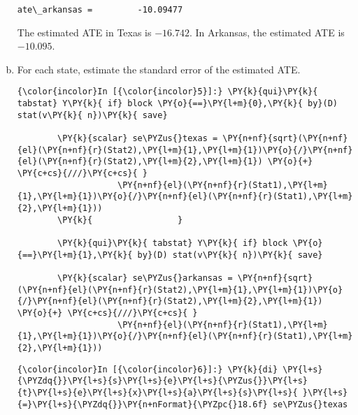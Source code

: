 \documentclass[11pt,notitlepage]{article}\usepackage[]{graphicx}\usepackage[]{color}
\makeatletter
\newenvironment{kframe}{%
 \def\at@end@of@kframe{}%
 \ifinner\ifhmode%
  \def\at@end@of@kframe{\end{minipage}}%
  \begin{minipage}{\columnwidth}%
 \fi\fi%
 \def\FrameCommand##1{\hskip\@totalleftmargin \hskip-\fboxsep
 \colorbox{shadecolor}{##1}\hskip-\fboxsep
     \hskip-\linewidth \hskip-\@totalleftmargin \hskip\columnwidth}%
 \MakeFramed {\advance\hsize-\width
   \@totalleftmargin\z@ \linewidth\hsize
   \@setminipage}}%
 {\par\unskip\endMakeFramed%
 \at@end@of@kframe}
\newenvironment{knitrout}{}{} %
\makeatother
\begin{document}
\begin{enumerate}[a)]
\begin{knitrout}
\begin{kframe}
    \begin{Verbatim}[commandchars=\\\{\}]
ate\_arkansas =         -10.09477

    \end{Verbatim}
\end{kframe}
\end{knitrout}

The estimated ATE in Texas is \ensuremath{-16.742}.  In Arkansas, the estimated ATE is \ensuremath{-10.095}.

\item For each state, estimate the standard error of the estimated ATE.
\begin{knitrout}
\color{fgcolor}\begin{kframe}
   \begin{Verbatim}[commandchars=\\\{\}]
{\color{incolor}In [{\color{incolor}5}]:} \PY{k}{qui}\PY{k}{ tabstat} Y\PY{k}{ if} block \PY{o}{==}\PY{l+m}{0},\PY{k}{ by}(D) stat(v\PY{k}{ n})\PY{k}{ save}	
        
        \PY{k}{scalar} se\PYZus{}texas = \PY{n+nf}{sqrt}(\PY{n+nf}{el}(\PY{n+nf}{r}(Stat2),\PY{l+m}{1},\PY{l+m}{1})\PY{o}{/}\PY{n+nf}{el}(\PY{n+nf}{r}(Stat2),\PY{l+m}{2},\PY{l+m}{1}) \PY{o}{+} \PY{c+cs}{///}\PY{c+cs}{ }
        			\PY{n+nf}{el}(\PY{n+nf}{r}(Stat1),\PY{l+m}{1},\PY{l+m}{1})\PY{o}{/}\PY{n+nf}{el}(\PY{n+nf}{r}(Stat1),\PY{l+m}{2},\PY{l+m}{1}))
        \PY{k}{					}
        
        \PY{k}{qui}\PY{k}{ tabstat} Y\PY{k}{ if} block \PY{o}{==}\PY{l+m}{1},\PY{k}{ by}(D) stat(v\PY{k}{ n})\PY{k}{ save}	
        
        \PY{k}{scalar} se\PYZus{}arkansas = \PY{n+nf}{sqrt}(\PY{n+nf}{el}(\PY{n+nf}{r}(Stat2),\PY{l+m}{1},\PY{l+m}{1})\PY{o}{/}\PY{n+nf}{el}(\PY{n+nf}{r}(Stat2),\PY{l+m}{2},\PY{l+m}{1}) \PY{o}{+} \PY{c+cs}{///}\PY{c+cs}{ }
        			\PY{n+nf}{el}(\PY{n+nf}{r}(Stat1),\PY{l+m}{1},\PY{l+m}{1})\PY{o}{/}\PY{n+nf}{el}(\PY{n+nf}{r}(Stat1),\PY{l+m}{2},\PY{l+m}{1}))
\end{Verbatim}

    \begin{Verbatim}[commandchars=\\\{\}]
{\color{incolor}In [{\color{incolor}6}]:} \PY{k}{di} \PY{l+s}{\PYZdq{}}\PY{l+s}{s}\PY{l+s}{e}\PY{l+s}{\PYZus{}}\PY{l+s}{t}\PY{l+s}{e}\PY{l+s}{x}\PY{l+s}{a}\PY{l+s}{s}\PY{l+s}{ }\PY{l+s}{=}\PY{l+s}{\PYZdq{}}\PY{n+nFormat}{\PYZpc{}18.6f} se\PYZus{}texas
\end{Verbatim}


\end{kframe}
\end{knitrout}
\end{enumerate}
\end{document}
